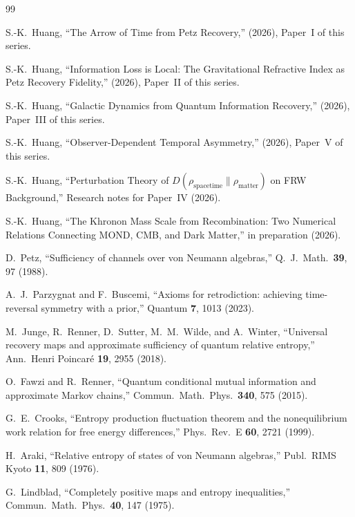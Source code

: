 \documentclass[prd,twocolumn,superscriptaddress,longbibliography,floatfix]{revtex4-2}
\begin{document}
\begin{thebibliography}{99}

S.-K.~Huang,
``The Arrow of Time from Petz Recovery,''
(2026), Paper~I of this series.

S.-K.~Huang,
``Information Loss is Local: The Gravitational Refractive
Index as Petz Recovery Fidelity,''
(2026), Paper~II of this series.

S.-K.~Huang,
``Galactic Dynamics from Quantum Information Recovery,''
(2026), Paper~III of this series.

S.-K.~Huang,
``Observer-Dependent Temporal Asymmetry,''
(2026), Paper~V of this series.

S.-K.~Huang,
``Perturbation Theory of $D(\rho_{\mathrm{spacetime}}
\|\rho_{\mathrm{matter}})$ on FRW Background,''
Research notes for Paper~IV (2026).

S.-K.~Huang,
``The Khronon Mass Scale from Recombination:
Two Numerical Relations Connecting MOND, CMB,
and Dark Matter,''
in preparation (2026).

D.~Petz,
``Sufficiency of channels over von Neumann algebras,''
Q.~J.\ Math.\ \textbf{39}, 97 (1988).

A.~J.~Parzygnat and F.~Buscemi,
``Axioms for retrodiction: achieving time-reversal
symmetry with a prior,''
Quantum \textbf{7}, 1013 (2023).

M.~Junge, R.~Renner, D.~Sutter, M.~M.~Wilde, and
A.~Winter,
``Universal recovery maps and approximate sufficiency
of quantum relative entropy,''
Ann.\ Henri Poincar\'{e} \textbf{19}, 2955 (2018).

O.~Fawzi and R.~Renner,
``Quantum conditional mutual information and
approximate Markov chains,''
Commun.\ Math.\ Phys.\ \textbf{340}, 575 (2015).

G.~E.~Crooks,
``Entropy production fluctuation theorem and the
nonequilibrium work relation for free energy
differences,''
Phys.\ Rev.\ E \textbf{60}, 2721 (1999).

H.~Araki,
``Relative entropy of states of von Neumann algebras,''
Publ.\ RIMS Kyoto \textbf{11}, 809 (1976).

G.~Lindblad,
``Completely positive maps and entropy inequalities,''
Commun.\ Math.\ Phys.\ \textbf{40}, 147 (1975).


\end{thebibliography}
\end{document}
